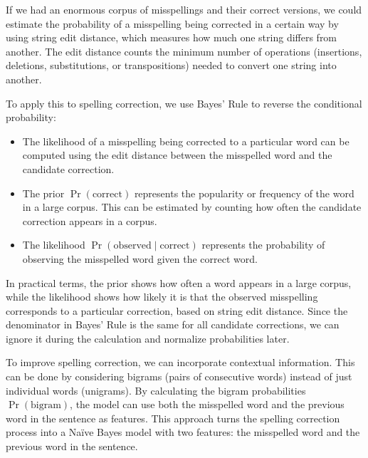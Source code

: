 If we had an enormous corpus of misspellings and their correct versions, we could estimate the probability of a misspelling being corrected in a certain way by using string edit distance, which measures how much one string differs from another.
The edit distance counts the minimum number of operations (insertions, deletions, substitutions, or transpositions) needed to convert one string into another.

To apply this to spelling correction, we use Bayes' Rule to reverse the conditional probability:
\begin{itemize}
    \item The likelihood of a misspelling being corrected to a particular word can be computed using the edit distance between the misspelled word and the candidate correction.
    \item The prior $\Pr(\text{correct})$ represents the popularity or frequency of the word in a large corpus. 
        This can be estimated by counting how often the candidate correction appears in a corpus.
        \item The likelihood $\Pr(\text{observed}\mid\text{correct})$ represents the probability of observing the misspelled word given the correct word.
\end{itemize}
In practical terms, the prior shows how often a word appears in a large corpus, while the likelihood shows how likely it is that the observed misspelling corresponds to a particular correction, based on string edit distance.
Since the denominator in Bayes' Rule is the same for all candidate corrections, we can ignore it during the calculation and normalize probabilities later.

To improve spelling correction, we can incorporate contextual information.
This can be done by considering bigrams (pairs of consecutive words) instead of just individual words (unigrams).
By calculating the bigram probabilities $\Pr(\text{bigram})$, the model can use both the misspelled word and the previous word in the sentence as features.
This approach turns the spelling correction process into a Naïve Bayes model with two features: the misspelled word and the previous word in the sentence.